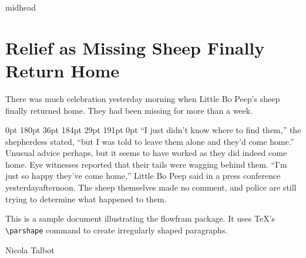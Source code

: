 \documentclass{article}
\begin{document}
\begin{staticcontents*}{midhead}
\section{Relief as Missing Sheep Finally Return Home}
\end{staticcontents*}

\framebreak
There was much celebration yesterday morning when Little Bo
Peep's sheep finally returned home. They had been missing
for more than a week.

{ 0pt \linewidth 0pt \linewidth 0pt \linewidth
0pt \linewidth 40pt 180pt 36pt 184pt 29pt 191pt
0pt \linewidth
``I just didn't know where to find them,'' the shepherdess
stated, ``but I was told to leave them alone and they'd come
home.'' Unusual advice perhaps, but it seems to have worked
as they did indeed come home. Eye witnesses reported that their
tails were wagging behind them.
``I'm just so happy they've come home,'' Little Bo Peep said
in a press conference yesterday\framebreak}afternoon.
The sheep themselves made no comment, and police are still 
trying to determine what happened to them.

\noindent\hrulefill

This is a sample document illustrating the 
flowfram package. It uses \TeX's \verb|\parshape| command
to create irregularly shaped paragraphs.

\hfill Nicola Talbot
\framebreak
\end{document}
